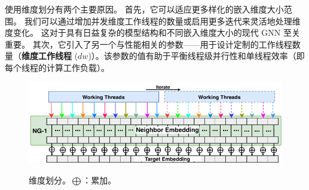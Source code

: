使用维度划分有两个主要原因。
首先，它可以适应更多样化的嵌入维度大小范围。
我们可以通过增加并发维度工作线程的数量或启用更多迭代来灵活地处理维度变化。
这对于具有日益复杂的模型结构和不同嵌入维度大小的现代 GNN 至关重要。
其次，它引入了另一个与性能相关的参数——用于设计定制的工作线程数量（\textbf{维度工作线程} ($dw$)）。该参数的值有助于平衡线程级并行性和单线程效率（即每个线程的计算工作负载）。
\begin{figure} [t] \small
    \centering
    \includegraphics[width=0.9\columnwidth]{images/dimension-sharing.pdf}
    \caption{维度划分。$\bigoplus$：累加。}
    \setlength{\abovecaptionskip}{0.4cm} %
    \setlength{\belowcaptionskip}{-0.4cm} %
    \label{fig: Dimension-based Workload Sharing.}
\end{figure}


